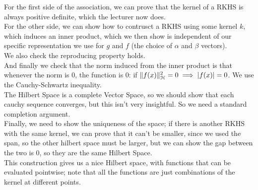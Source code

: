 \documentclass[12pt]{article}
\begin{document}
For the first side of the association,
we can prove that the kernel of a RKHS 
is always positive definite, which the 
lecturer now does. \\

For the other side, 
we can show how to contrusct a RKHS using
some kernel $k$, which induces an inner product,
which we then show is independent of
our specific representation we use for $g$
and $f$ (the choice of $\alpha$ and $\beta$ vectors). \\
We also check the reproducing property holds. \\
And finally we check that the norm induced from the
inner product is that whenever the norm is $0$,
the function is $0$: if $\|f(x)\|^2_{\mathcal{H}} = 0 \implies
|f(x)| = 0$. We use the Cauchy-Schwartz inequality. \\
The Hilbert Space is a complete Vector Space,
so we should show that each cauchy sequence
converges, but this isn't very insightful. 
So we need a standard completion argument. \\
Finally, we need to show the uniqueness of the space;
if there is another RKHS with the same kernel, we
can prove that it can't be smaller, since we
used the span, so the other hilbert space must be
larger, but we can show the gap between the two
is 0, so they are the same Hilbert Space. \\

This construction gives us a nice Hilbert space,
with functions that can be evaluated pointwise;
note that all the functions are just combinations
of the kernel at different points. \\
\end{document}
